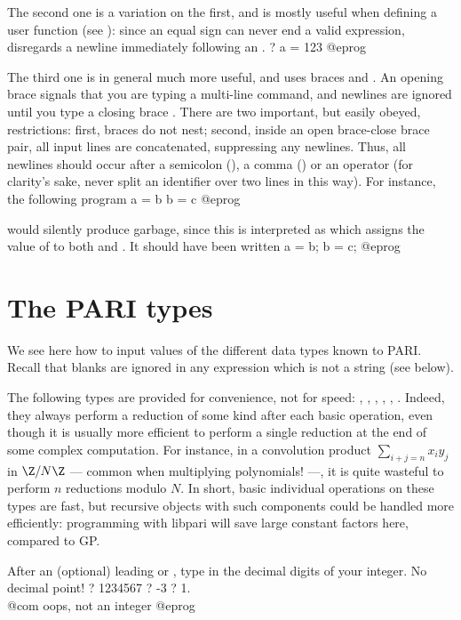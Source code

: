 The second one is a variation on the first, and is mostly useful when
defining a user function (see ): since an equal sign
can never end a valid expression,  disregards a newline immediately
following an \kbd{=}.
\bprog
? a =
123
@eprog

The third one is in general much more useful, and uses braces \kbd{\obr} and
\kbd{\cbr}. An opening brace \kbd{\obr} signals that
you are typing a multi-line command, and newlines are ignored until you type
a closing brace \kbd{\cbr}. There are two important, but easily obeyed,
restrictions: first, braces do not nest; second, inside an open brace-close
brace pair, all input lines are concatenated, suppressing any newlines. Thus,
all newlines should occur after a semicolon (\kbd{;}), a comma (\kbd{,}) or
an operator (for clarity's sake, never split an identifier over two lines in
this way). For instance, the following program
\bprog
{
  a = b
  b = c
}
@eprog

\noindent would silently produce garbage, since this is interpreted as
 which assigns the value of  to both  and
. It should have been written
\bprog
{
  a = b;
  b = c;
}
@eprog

\section{The PARI types}

\noindent
We see here how to input values of the different data types known to PARI.
Recall that blanks are ignored in any expression which is not a string (see
below).

The following types are provided for convenience, not for speed:
, , , , ,
. Indeed, they always perform a reduction of some kind after
each basic operation, even though it is usually more efficient to perform
a single reduction at the end of some complex computation. For instance,
in a convolution product $\sum_{i+j = n} x_i y_j$ in $\Z/N\Z$ --- common
when multiplying polynomials! ---, it is quite wasteful to perform $n$
reductions modulo $N$. In short, basic individual operations on these types
are fast, but recursive objects with such components could be handled more
efficiently: programming with libpari will save large constant factors here,
compared to GP.

%
After an (optional) leading \kbd{+} or \kbd{-}, type in the
decimal digits of your integer. No decimal point!
\bprog
? 1234567
? -3
? 1.         \\@com oops, not an integer
@eprog

